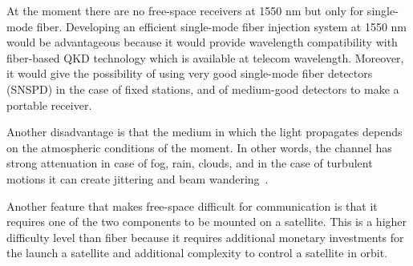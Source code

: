 At the moment there are no free-space receivers at 1550 nm but only for single-mode fiber. Developing an efficient single-mode fiber injection system at 1550 nm would be advantageous because it would provide wavelength compatibility with fiber-based QKD technology which is available at telecom wavelength. Moreover, it would give the possibility of using very good single-mode fiber detectors (SNSPD) in the case of fixed stations, and of medium-good detectors to make a portable receiver.

Another disadvantage is that the medium in which the light propagates depends on the atmospheric conditions of the moment. In other words, the channel has strong attenuation in case of fog, rain, clouds, and in the case of turbulent motions it can create jittering and beam wandering~\cite{a25}.

Another feature that makes free-space difficult for communication is that it requires one of the two components to be mounted on a satellite. This is a higher difficulty level than fiber because it requires additional monetary investments for the launch a satellite and additional complexity to control a satellite in orbit.